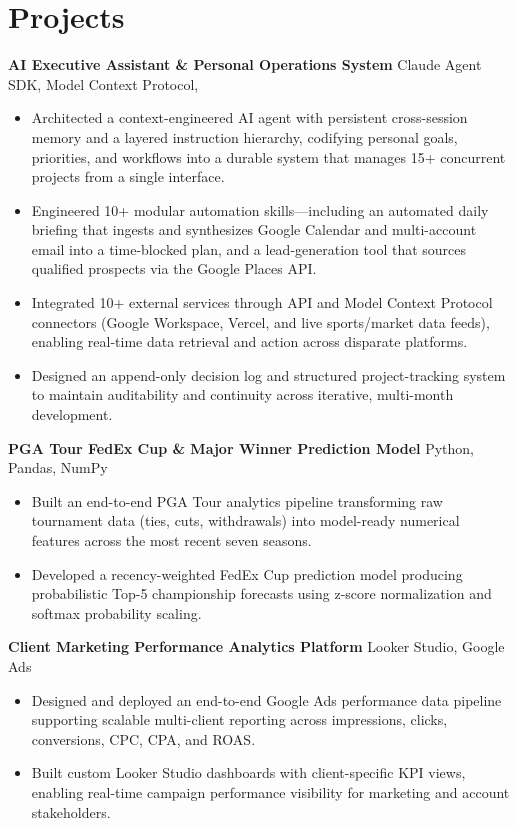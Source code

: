 \documentclass[10.5pt]{article}
\begin{document}
\section{Projects}

\textbf{AI Executive Assistant \& Personal Operations System} \hfill Claude Agent SDK, Model Context Protocol,
\begin{itemize}[leftmargin=*, itemsep=0pt, topsep=1pt]
\item Architected a context-engineered AI agent with persistent cross-session memory and a layered instruction hierarchy, codifying personal goals, priorities, and workflows into a durable system that manages 15+ concurrent projects from a single interface.
\item Engineered 10+ modular automation skills—including an automated daily briefing that ingests and synthesizes Google Calendar and multi-account email into a time-blocked plan, and a lead-generation tool that sources qualified prospects via the Google Places API.
\item Integrated 10+ external services through API and Model Context Protocol connectors (Google Workspace, Vercel, and live sports/market data feeds), enabling real-time data retrieval and action across disparate platforms.
\item Designed an append-only decision log and structured project-tracking system to maintain auditability and continuity across iterative, multi-month development.
\end{itemize}

\textbf{PGA Tour FedEx Cup \& Major Winner Prediction Model} \hfill Python, Pandas, NumPy
\begin{itemize}[leftmargin=*, itemsep=0pt, topsep=1pt]
\item Built an end-to-end PGA Tour analytics pipeline transforming raw tournament data (ties, cuts, withdrawals) into model-ready numerical features across the most recent seven seasons.
\item Developed a recency-weighted FedEx Cup prediction model producing probabilistic Top-5 championship forecasts using z-score normalization and softmax probability scaling.
\end{itemize}

\textbf{Client Marketing Performance Analytics Platform} \hfill Looker Studio, Google Ads
\begin{itemize}[leftmargin=*, itemsep=0pt, topsep=1pt]
\item Designed and deployed an end-to-end Google Ads performance data pipeline supporting scalable multi-client reporting across impressions, clicks, conversions, CPC, CPA, and ROAS.
\item Built custom Looker Studio dashboards with client-specific KPI views, enabling real-time campaign performance visibility for marketing and account stakeholders.
\end{itemize}
\end{document}
